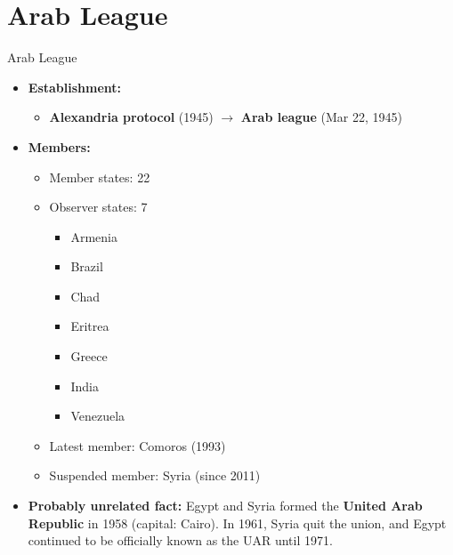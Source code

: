\documentclass[
  12pt,
  ignorenonframetext,
  progressbar=frametitle]{beamer}
\providecommand{\tightlist}{%
  \setlength{\itemsep}{0pt}\setlength{\parskip}{0pt}}
\begin{document}
\section{Arab League}
\begin{frame}[allowframebreaks]
{Arab League}
\protect\hypertarget{arab-league}{}
\begin{itemize}
\tightlist
\item
  \textbf{Establishment:}

  \begin{itemize}
  \tightlist
  \item
    \textbf{Alexandria protocol} (1945) \(\rightarrow\) \textbf{Arab
    league} (Mar 22, 1945)
  \end{itemize}
\item
  \textbf{Members:}

  \begin{itemize}
  \tightlist
  \item
    Member states: 22
  \item
    Observer states: 7

    \begin{itemize}
    \tightlist
    \item
      Armenia
    \item
      Brazil
    \item
      Chad
    \item
      Eritrea
    \item
      Greece
    \item
      India
    \item
      Venezuela
    \end{itemize}
  \item
    Latest member: Comoros (1993)
  \item
    Suspended member: Syria (since 2011)
  \end{itemize}
\item
  \textbf{Probably unrelated fact:} Egypt and Syria formed the
  \textbf{United Arab Republic} in 1958 (capital: Cairo). In 1961, Syria
  quit the union, and Egypt continued to be officially known as the UAR
  until 1971.
\end{itemize}
\end{frame}
\end{document}
